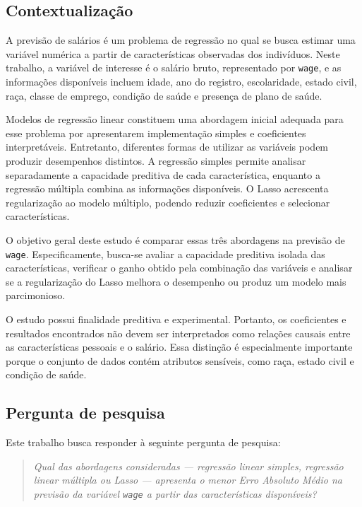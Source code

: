 \subsection{Contextualização}

A previsão de salários é um problema de regressão no qual se busca estimar uma variável numérica a partir de características observadas dos indivíduos. Neste trabalho, a variável de interesse é o salário bruto, representado por \texttt{wage}, e as informações disponíveis incluem idade, ano do registro, escolaridade, estado civil, raça, classe de emprego, condição de saúde e presença de plano de saúde.

Modelos de regressão linear constituem uma abordagem inicial adequada para esse problema por apresentarem implementação simples e coeficientes interpretáveis. Entretanto, diferentes formas de utilizar as variáveis podem produzir desempenhos distintos. A regressão simples permite analisar separadamente a capacidade preditiva de cada característica, enquanto a regressão múltipla combina as informações disponíveis. O Lasso acrescenta regularização ao modelo múltiplo, podendo reduzir coeficientes e selecionar características.

O objetivo geral deste estudo é comparar essas três abordagens na previsão de \texttt{wage}. Especificamente, busca-se avaliar a capacidade preditiva isolada das características, verificar o ganho obtido pela combinação das variáveis e analisar se a regularização do Lasso melhora o desempenho ou produz um modelo mais parcimonioso.

O estudo possui finalidade preditiva e experimental. Portanto, os coeficientes e resultados encontrados não devem ser interpretados como relações causais entre as características pessoais e o salário. Essa distinção é especialmente importante porque o conjunto de dados contém atributos sensíveis, como raça, estado civil e condição de saúde.

\subsection{Pergunta de pesquisa}
Este trabalho busca responder à seguinte pergunta de pesquisa:

\begin{quote}
    \textit{Qual das abordagens consideradas --- regressão linear simples, regressão linear múltipla ou Lasso --- apresenta o menor Erro Absoluto Médio na previsão da variável \texttt{wage} a partir das características disponíveis?}
\end{quote}

\newpage
